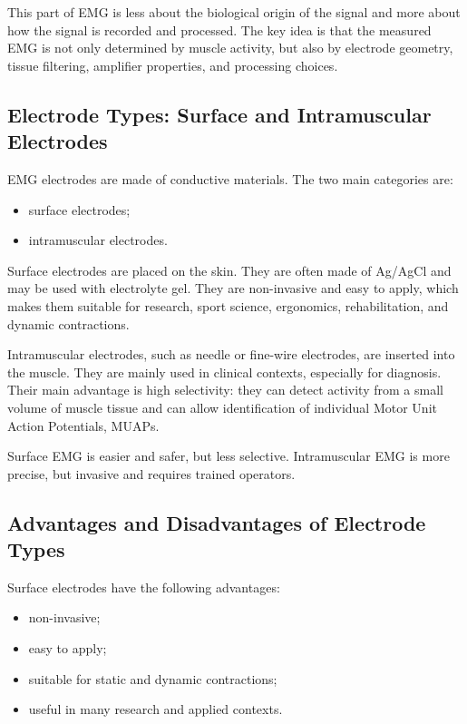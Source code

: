\begin{authornote}
This part of EMG is less about the biological origin of the signal and more about how the signal is recorded and processed. The key idea is that the measured EMG is not only determined by muscle activity, but also by electrode geometry, tissue filtering, amplifier properties, and processing choices.
\end{authornote}

\subsection{Electrode Types: Surface and Intramuscular Electrodes}

EMG electrodes are made of conductive materials. The two main categories are:

\begin{itemize}[noitemsep]
    \item surface electrodes;
    \item intramuscular electrodes.
\end{itemize}

Surface electrodes are placed on the skin. They are often made of Ag/AgCl and may be used with electrolyte gel. They are non-invasive and easy to apply, which makes them suitable for research, sport science, ergonomics, rehabilitation, and dynamic contractions.

Intramuscular electrodes, such as needle or fine-wire electrodes, are inserted into the muscle. They are mainly used in clinical contexts, especially for diagnosis. Their main advantage is high selectivity: they can detect activity from a small volume of muscle tissue and can allow identification of individual Motor Unit Action Potentials, MUAPs.

\begin{authornote}
Surface EMG is easier and safer, but less selective. Intramuscular EMG is more precise, but invasive and requires trained operators.
\end{authornote}

\subsection{Advantages and Disadvantages of Electrode Types}

Surface electrodes have the following advantages:

\begin{itemize}[noitemsep]
    \item non-invasive;
    \item easy to apply;
    \item suitable for static and dynamic contractions;
    \item useful in many research and applied contexts.
\end{itemize}

